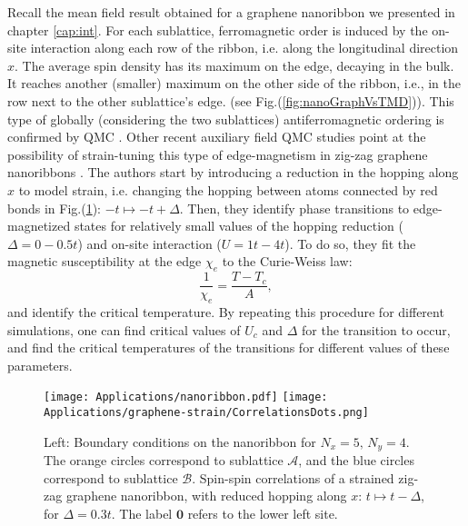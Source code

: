 Recall the mean field result obtained for a graphene nanoribbon we presented in chapter \ref{cap:int}.
For each sublattice, ferromagnetic order is induced by the on-site interaction along each row of the ribbon, i.e. along the longitudinal direction $x$.
The average spin density has its maximum on the edge, decaying in the bulk.
It reaches another (smaller) maximum on the other side of the ribbon, i.e., in the row next to the other sublattice's edge. (see Fig.(\ref{fig:nanoGraphVsTMD})).
This type of globally (considering the two sublattices) antiferromagnetic ordering is confirmed by \ac{QMC} \cite{feldner_dynamical_2011, raczkowski_interplay_2017}.
Other recent auxiliary field \ac{QMC} studies point at the possibility of strain-tuning this type of edge-magnetism in zig-zag graphene nanoribbons \cite{yang_strain-tuning_2017}.
The authors start by introducing a reduction in the hopping along $x$ to model strain, i.e. changing the hopping between atoms connected by red bonds in Fig.(\ref{fig:bcRibbon}): $-t \mapsto -t + \Delta$.
Then, they identify phase transitions to edge-magnetized states for relatively small values of the hopping reduction ($\Delta = 0-0.5t$) and on-site interaction ($U = 1 t- 4t$).
To do so, they fit the magnetic susceptibility at the edge $\chi_e$ to the Curie-Weiss law:
\begin{equation}
\frac{1}{\chi_e} = \frac{T - T_c}{A} ,
\end{equation}
and identify the critical temperature.
By repeating this procedure for different simulations, one can find critical values of $U_c$ and $\Delta$ for the transition to occur, and find the critical temperatures of the transitions for different values of these parameters.

\begin{figure}[H]
\hspace{-0.6cm}
\texttt{[image: Applications/nanoribbon.pdf]}
\texttt{[image: Applications/graphene-strain/CorrelationsDots.png]}
	\caption[Boundary conditions on the nanoribbon. Spin-spin correlations of a strained zig-zag graphene nanoribbon.]{Left: Boundary conditions on the nanoribbon for $N_x = 5, \, N_y = 4$. The orange circles correspond to sublattice $\mathcal{A}$, and the blue circles correspond to sublattice $\mathcal{B}$.
	Spin-spin correlations of a strained zig-zag graphene nanoribbon, with reduced hopping along $x$: $t \mapsto t - \Delta$, for $\Delta = 0.3t$. The label $\bm 0$ refers to the lower left site.
}
	\label{fig:bcRibbon}
\end{figure}

